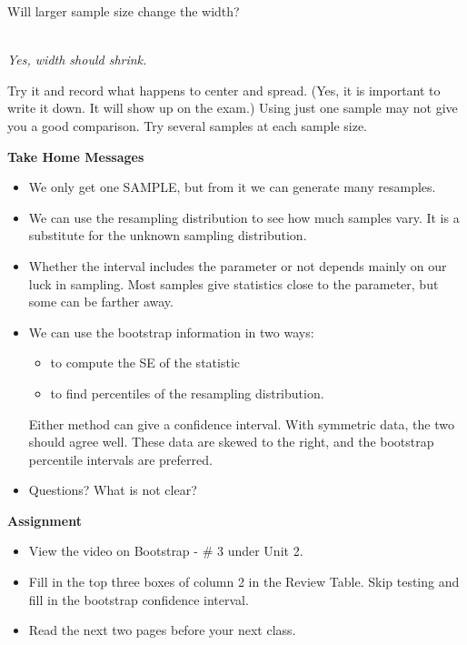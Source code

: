 \begin{enumerate}
   Will larger sample size  change the width?\\
\begin{students}
        \vspace{.5cm}        
\end{students}
\begin{key}
\\ {\it Yes, width should shrink.}
\end{key}

   Try it and record what happens to center and spread.  (Yes, it is
   important to write it down. It will show up on the exam.)  Using
   just one sample may not give you a good comparison.  Try several
   samples at each sample size. 
   \vfill
\end{enumerate}

\begin{center}
  {\bf Take Home Messages}
\end{center}
\begin{itemize}
  \item   We only get one SAMPLE, but from it we can generate many
    resamples.
  \item We can use the resampling distribution to see how much
    samples vary. It is a substitute for the unknown sampling
    distribution.
  \item Whether the interval includes the parameter or not
    depends mainly on our luck in sampling.  Most samples give statistics
    close to the parameter, but some can be farther away.
  \item We can use the bootstrap information in two ways:
    \begin{itemize}
    \item to compute the SE of the statistic
    \item to find percentiles of the resampling distribution.
    \end{itemize}
   Either method can give a confidence interval.  With symmetric data, the
   two should agree well.  These data are skewed to the right, and the
   bootstrap percentile intervals are preferred.
 \item 
  Questions?  What is not clear?\vfill
  \end{itemize}
  

\noindent
{\bf Assignment} \vspace{-.2in}
\begin{itemize}
 \item View the video on Bootstrap - \# 3 under Unit 2.
 \item Fill in the top three boxes of column 2 in the Review
   Table. Skip testing and fill in the bootstrap confidence interval. 
\item Read the next two pages before your next class.
\end{itemize}

